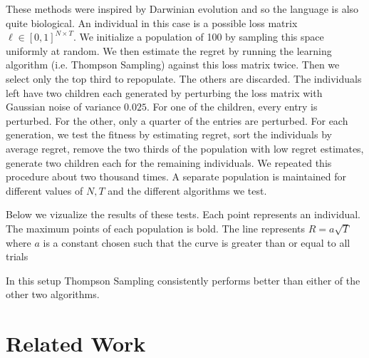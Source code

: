 \documentclass[10pt,a4paper]{article} %
\begin{document}
	These methods were inspired by Darwinian evolution and so the language is also quite biological.  An individual in this case is a possible loss matrix $\ell \in \left[ 0, 1 \right]^{N \times T} $.  We initialize a population of 100 by sampling this space uniformly at random.  We then estimate the regret by running the learning algorithm (i.e. Thompson Sampling) against this loss matrix twice.  Then we select only the top third to repopulate.  The others are discarded.  The individuals left have two children each generated by perturbing the loss matrix with Gaussian noise of variance $0.025$.  For one of the children, every entry is perturbed. For the other, only a quarter of the entries are perturbed.  For each generation, we test the fitness by estimating regret, sort the individuals by average regret, remove the two thirds of the population with low regret estimates, generate two children each for the remaining individuals.  We repeated this procedure about two thousand times.  A separate population is maintained for different values of $N, T$ and the different algorithms we test.
		
	Below we vizualize the results of these tests.  Each point represents an individual.  The maximum points of each population is bold.  The line represents $R = a \sqrt{T}$ where $a$ is a constant chosen such that the curve is greater than or equal to all trials 
	
		
	\begin{figure}[h!]
	\end{figure}

	In this setup Thompson Sampling consistently performs better than either of the other two algorithms.

	\section{Related Work}
	
\end{document}
